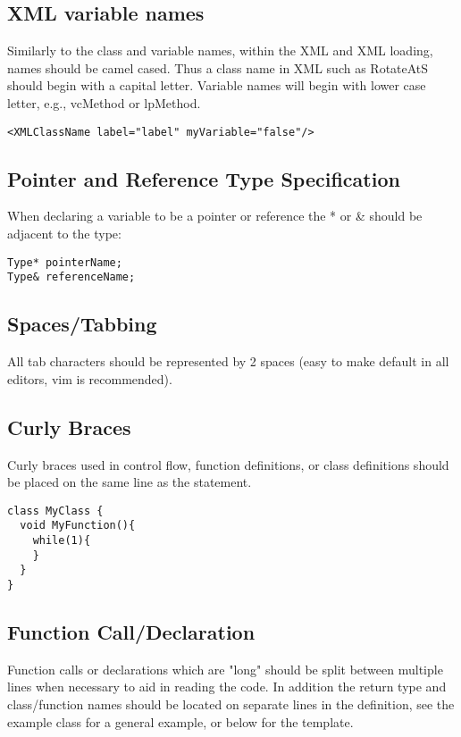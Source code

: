 \documentclass[12pt]{article}
\begin{document}
\subsection{XML variable names}
Similarly to the class and variable names, within the XML and XML loading, names should be camel cased. Thus a class
name in XML such as RotateAtS should begin with a capital letter. Variable names will begin with lower case letter,
e.g., vcMethod or lpMethod.

\begin{lstlisting}
<XMLClassName label="label" myVariable="false"/>
\end{lstlisting}

\subsection{Pointer and Reference Type Specification}
When declaring a variable to be a pointer or reference the * or \& should be adjacent to the type:

\begin{lstlisting}
Type* pointerName;
Type& referenceName;
\end{lstlisting}

\subsection{Spaces/Tabbing}
All tab characters should be represented by 2 spaces (easy to make default in all editors, vim is recommended).

\subsection{Curly Braces}
Curly braces used in control flow, function definitions, or class definitions should be placed on the same line as the
statement.

\begin{lstlisting}
class MyClass {
  void MyFunction(){
    while(1){
    }
  }
}
\end{lstlisting}

\subsection{Function Call/Declaration}
Function calls or declarations which are "long" should be split between multiple lines when necessary to aid in reading
the code. In addition the return type and class/function names should be located on separate lines in the definition,
see the example class for a general example, or below for the template.
\end{document}

